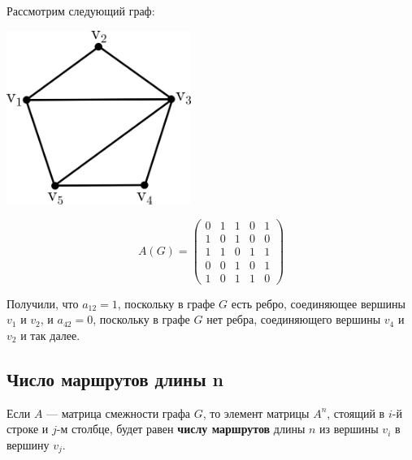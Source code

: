 \begin{example*}
    Рассмотрим следующий граф:

    \begin{multicols}{2}
        \begin{center}
            \includegraphics[width=0.45\textwidth]{images/adjacency-matrix-example.png}
        \end{center}

        \columnbreak

        \null \vfill
        \[
            A(G) =
            \begin{pmatrix}
                0 & 1 & 1 & 0 & 1 \\
                1 & 0 & 1 & 0 & 0 \\
                1 & 1 & 0 & 1 & 1 \\
                0 & 0 & 1 & 0 & 1 \\
                1 & 0 & 1 & 1 & 0
            \end{pmatrix}
        \]
        \vfill \null
    \end{multicols}

    Получили, что \(a_{12} = 1\), поскольку в графе \(G\) есть ребро, соединяющее вершины \(v_1\) и \(v_2\), и \(a_{42} = 0\), поскольку в графе \(G\) нет ребра, соединяющего вершины \(v_4\) и \(v_2\) и так далее.
\end{example*}

\subsection{Число маршрутов длины n}

Если \(A\) --- матрица смежности графа \(G\), то элемент матрицы \(A^n\), стоящий в \(i\)-й строке и \(j\)-м столбце, будет равен \textbf{числу маршрутов} длины \(n\) из вершины \(v_i\) в вершину \(v_j\).

